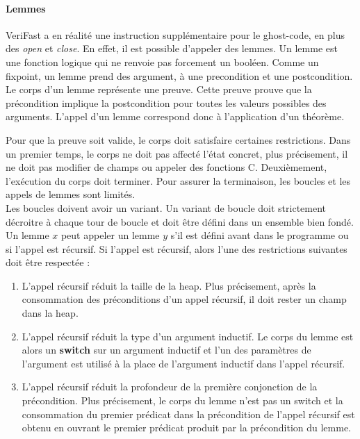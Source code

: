 \documentclass[11pt,openany]{article}
\newcommand{\verifast}{VeriFast}
\begin{document}
			\paragraph{Lemmes}
			\verifast{} a en r\'ealit\'e une instruction suppl\'ementaire pour le ghost-code, en plus des \textit{open} et \textit{close}. En effet, il est possible d'appeler des lemmes. Un lemme est une fonction logique qui ne renvoie pas forcement un bool\'een. Comme un fixpoint, un lemme prend des argument, \`a une precondition et une postcondition. Le corps d'un lemme repr\'esente une preuve. Cette preuve prouve que la pr\'econdition implique la postcondition pour toutes les valeurs possibles des arguments. L'appel d'un lemme correspond donc \`a l'application d'un th\'eor\`eme.\par
			Pour que la preuve soit valide, le corps doit satisfaire certaines restrictions. Dans un premier temps, le corps ne doit pas affect\'e l'\'etat concret, plus pr\'ecisement, il ne doit pas modifier de champs ou appeler des fonctions C. Deuxi\`emement, l'ex\'ecution du corps doit terminer. Pour assurer la terminaison, les boucles et les appels de lemmes sont limit\'es. \\
			Les boucles doivent avoir un variant. Un variant de boucle doit strictement d\'ecroitre  \`a chaque tour de boucle et doit \^etre d\'efini dans un ensemble bien fond\'e.\\
			Un lemme $x$ peut appeler un lemme $y$ s'il est d\'efini avant dans le programme ou si l'appel est r\'ecursif. Si l'appel est r\'ecursif, alors l'une des restrictions suivantes doit \^etre respect\'ee :
			\begin{enumerate}
			\item L'appel r\'ecursif r\'eduit la taille de la heap. Plus pr\'ecisement, apr\`es la consommation des pr\'econditions d'un appel r\'ecursif, il doit rester un champ dans la heap.
			\item L'appel r\'ecursif r\'eduit la type d'un argument inductif. Le corps du lemme est alors un \textbf{switch} sur un argument inductif et l'un des param\`etres de l'argument est utilis\'e \`a la place de l'argument inductif dans l'appel r\'ecursif.
			\item L'appel r\'ecursif r\'eduit la profondeur de la premi\`ere conjonction de la pr\'econdition. Plus pr\'ecisement, le corps du lemme n'est pas un switch et la consommation du premier pr\'edicat dans la pr\'econdition de l'appel r\'ecursif est obtenu en ouvrant le premier pr\'edicat produit par la pr\'econdition du lemme.
			\end{enumerate}
				
\end{document}

